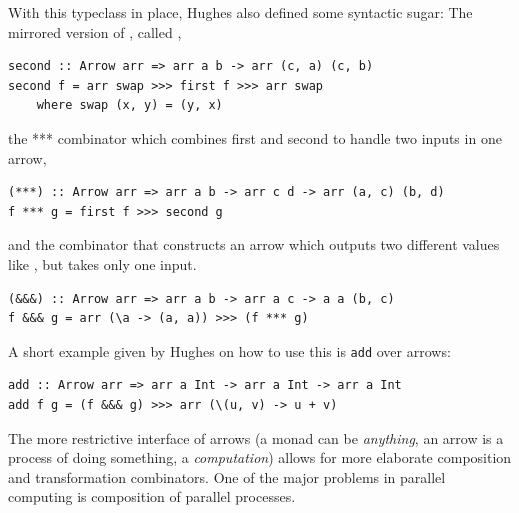 With this typeclass in place, Hughes also defined some syntactic sugar: The mirrored version of , called ,
\begin{lstlisting}[frame=htrbl]
second :: Arrow arr => arr a b -> arr (c, a) (c, b)
second f = arr swap >>> first f >>> arr swap
	where swap (x, y) = (y, x)
\end{lstlisting}
the *** combinator which combines first and second to handle two inputs in one arrow,
\begin{lstlisting}[frame=htrbl]
(***) :: Arrow arr => arr a b -> arr c d -> arr (a, c) (b, d)
f *** g = first f >>> second g
\end{lstlisting}
and the \code{&&&} combinator that constructs an arrow which outputs two different values like \code{***}, but takes only one input.
\begin{lstlisting}[frame=htrbl]
(&&&) :: Arrow arr => arr a b -> arr a c -> a a (b, c)
f &&& g = arr (\a -> (a, a)) >>> (f *** g)
\end{lstlisting}
A short example given by Hughes on how to use this is \lstinline{add} over arrows:
\begin{lstlisting}[frame=htrbl]
add :: Arrow arr => arr a Int -> arr a Int -> arr a Int
add f g = (f &&& g) >>> arr (\(u, v) -> u + v)
\end{lstlisting}
%
The more restrictive interface of arrows (a monad can be \emph{anything}, an arrow is a process of doing something, a \emph{computation}) allows for more elaborate composition and transformation combinators. One of the major problems in parallel computing is composition of parallel processes.


